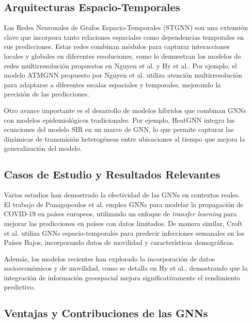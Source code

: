 \subsection{Arquitecturas Espacio-Temporales}

Las Redes Neuronales de Grafos Espacio-Temporales (STGNN) son una extensión clave que incorpora tanto relaciones espaciales como dependencias temporales en sus predicciones. Estas redes combinan módulos para capturar interacciones locales y globales en diferentes resoluciones, como lo demuestran los modelos de redes multirresolución propuestos en Nguyen et al.\parencite{Nguyen2023NZSTGNN} y Hy et al.\parencite{hy2022temporal}. Por ejemplo, el modelo ATMGNN propuesto por Nguyen et al.\parencite{Nguyen2023NZSTGNN} utiliza atención multirresolución para adaptarse a diferentes escalas espaciales y temporales, mejorando la precisión de las predicciones.

Otro avance importante es el desarrollo de modelos híbridos que combinan GNNs con modelos epidemiológicos tradicionales. Por ejemplo, HeatGNN\parencite{Zheng2024HeatGNN} integra las ecuaciones del modelo SIR en un marco de GNN, lo que permite capturar las dinámicas de transmisión heterogéneas entre ubicaciones al tiempo que mejora la generalización del modelo.

\subsection{Casos de Estudio y Resultados Relevantes}

Varios estudios han demostrado la efectividad de las GNNs en contextos reales. El trabajo de Panagopoulos et al.\parencite{Panagopoulos_Nikolentzos_Vazirgiannis_2021} emplea GNNs para modelar la propagación de COVID-19 en países europeos, utilizando un enfoque de \textit{transfer learning} para mejorar las predicciones en países con datos limitados. De manera similar, Croft et al.\parencite{Croft2023DutchSARS} utiliza GNNs espacio-temporales para predecir infecciones semanales en los Países Bajos, incorporando datos de movilidad y características demográficas.

Además, los modelos recientes han explorado la incorporación de datos socioeconómicos y de movilidad, como se detalla en Hy et al.\parencite{hy2022temporal}, demostrando que la integración de información geoespacial mejora significativamente el rendimiento predictivo.

\subsection{Ventajas y Contribuciones de las GNNs}

